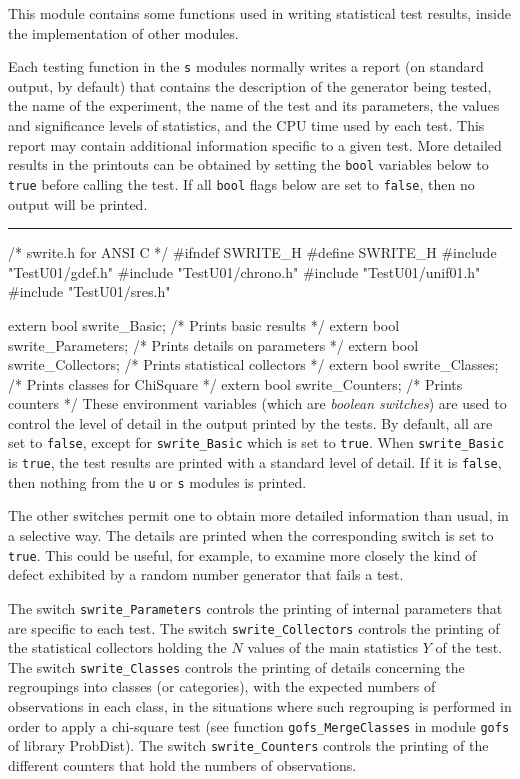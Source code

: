 
This module contains some functions used in writing statistical
test results, inside the implementation of other modules.

Each testing function in the {\tt s} modules normally
writes a report (on standard output, by default)
that contains the description of the generator being tested,
the name of the experiment, the name of the test and its parameters,
the values and significance levels of statistics,
and the CPU time used by each test.
This report may contain additional information specific to a given test.
More detailed results in the printouts can be obtained by setting
the {\tt bool} variables below to {\tt true} before
calling the test. If all {\tt bool} flags below are set to {\tt false}, then
no output will be printed.


\bigskip\hrule
\code\hide
/* swrite.h for ANSI C */
#ifndef SWRITE_H
#define SWRITE_H
\endhide
#include "TestU01/gdef.h"
#include "TestU01/chrono.h"
#include "TestU01/unif01.h"
#include "TestU01/sres.h"
\endcode



\code

extern bool swrite_Basic;           /* Prints basic results           */
extern bool swrite_Parameters;      /* Prints details on parameters   */
extern bool swrite_Collectors;      /* Prints statistical collectors  */
extern bool swrite_Classes;         /* Prints classes for ChiSquare   */
extern bool swrite_Counters;        /* Prints counters                */
\endcode
 \tab These environment variables (which are {\em boolean switches\/}) are used to
  control the level of detail in the output printed by the tests.
  By default, all are set to {\tt false}, except for
  {\tt swrite\_Basic} which is set to {\tt true}.
  When {\tt swrite\_Basic} is {\tt true}, the test results are printed
  with a standard level of detail.
  If it is {\tt false}, then nothing from the  {\tt u} or  {\tt s}
  modules is printed.

  The other switches permit one to obtain more detailed information than
  usual, in a selective way.  The details are printed when the
  corresponding switch is set to {\tt true}.
  This could be useful, for example, to examine more closely the kind of
  defect exhibited by a random number generator that fails a test.

  The switch {\tt swrite\_Parameters}  controls the printing of
  internal parameters that are specific to each test.
  The switch {\tt swrite\_Collectors} controls the printing of the
  statistical collectors holding the $N$ values of the main statistics
  $Y$ of the test.
  The switch {\tt swrite\_Classes} controls the printing of details
  concerning the regroupings into classes (or categories),
  with the expected numbers of observations in each class,
  in the situations where such regrouping is performed in order
  to apply a  chi-square test (see function  {\tt gofs\_MergeClasses}
  in module {\tt gofs} of library ProbDist).
  The switch {\tt swrite\_Counters} controls the printing of the different
  counters that hold the numbers of observations.
 \endtab
\code


